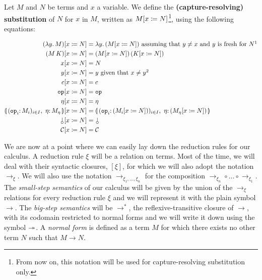 \begin{definition}
  Let $M$ and $N$ be terms and $x$ a variable. We define the
  \textbf{(capture-resolving) substitution} of $N$ for $x$ in $M$, written as
  $M[x \coloneqq N]$\footnote{From now on, this notation will be used for
    capture-resolving substitution only.}, using the following equations:

  \begin{align*}
    \subst{(\lam{y}{M})}{x}{N} &= \lam{y}{(\subst{M}{x}{N})} \textrm{ assuming
      that } y \neq x \textrm{ and $y$ is fresh for $N$} \footnotemark \\
    \subst{(\ap{M}{K})}{x}{N} &= \ap{(\subst{M}{x}{N})}{(\subst{K}{x}{N})} \\
    \subst{x}{x}{N} &= N \\
    \subst{y}{x}{N} &= y \textrm{ given that } x \neq y \footnotemark \\
    \subst{c}{x}{N} &= c \\
    \subst{\op{op}}{x}{N} &= \op{op} \\
    \subst{\eta}{x}{N} &= \eta \\
    \subst{\cibanana}{x}{N} &= \banana{(\onto{\op{op}_i}
      (\subst{M_i}{x}{N}))_{i \in I},\ \onto{\eta} (\subst{M_\eta}{x}{N})} \\
    \subst{\cherry}{x}{N} &= \cherry \\
    \subst{\CC}{x}{N} &= \CC
  \end{align*}
\end{definition}

\addtocounter{footnote}{-1}

We are now at a point where we can easily lay down the reduction rules for
our calculus. A reduction rule $\xi$ will be a relation on terms. Most of
the time, we will deal with their syntactic closures, $[\xi]$, for which we
will also adopt the notation $\to_\xi$. We will also use the notation
$\to_{\xi_1,\dots,\xi_n}$ for the composition $\to_{\xi_n} \circ \dots
\circ \to_{\xi_1}$. The \emph{small-step semantics} of our calculus will be
given by the union of the $\to_\xi$ relations for every reduction rule
$\xi$ and we will represent it with the plain symbol $\to$. The
\emph{big-step semantics} will be $\to^*$, the reflexive-transitive closure
of $\to$, with its codomain restricted to normal forms and we will write it
down using the symbol $\twoheadrightarrow$. A \emph{normal form} is defined as a term $M$
for which there exists no other term $N$ such that $M \to N$.

